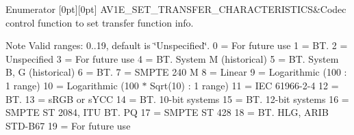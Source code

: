 \begin{DoxyEnumFields}{Enumerator}
[0pt][0pt]{}\mbox{\label{group__aom__encoder_ggae78dde67a6d78f332e9bdba0dde42db5a336fc3607a5987f9077c634f07b3cd53}} 
A\+V1\+E\+\_\+\+S\+E\+T\+\_\+\+T\+R\+A\+N\+S\+F\+E\+R\+\_\+\+C\+H\+A\+R\+A\+C\+T\+E\+R\+I\+S\+T\+I\+CS&Codec control function to set transfer function info. \begin{DoxyNote}{Note}
Valid ranges\+: 0..19, default is \char`\"{}\+Unspecified\char`\"{}. 0 = For future use 1 = B\+T. 2 = Unspecified 3 = For future use 4 = B\+T. System M (historical) 5 = B\+T. System B, G (historical) 6 = B\+T. 7 = S\+M\+P\+TE 240 M 8 = Linear 9 = Logarithmic (100 \+: 1 range) 10 = Logarithmic (100 $\ast$ Sqrt(10) \+: 1 range) 11 = I\+EC 61966-\/2-\/4 12 = B\+T. 13 = s\+R\+GB or s\+Y\+CC 14 = B\+T. 10-\/bit systems 15 = B\+T. 12-\/bit systems 16 = S\+M\+P\+TE ST 2084, I\+TU B\+T. PQ 17 = S\+M\+P\+TE ST 428 18 = B\+T. H\+LG, A\+R\+IB S\+T\+D-\/\+B67 19 = For future use 
\end{DoxyNote}
\\
\hline


\end{DoxyEnumFields}
